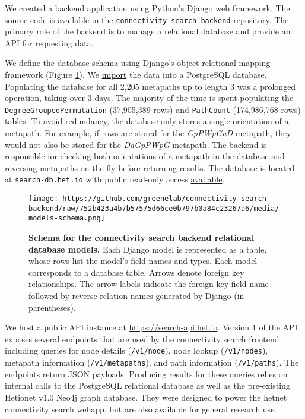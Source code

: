 We created a backend application using Python's Django web framework.
The source code is available in the \href{https://github.com/greenelab/connectivity-search-backend}{\texttt{connectivity-search-backend}} repository.
The primary role of the backend is to manage a relational database and provide an API for requesting data.

We define the database schema \href{https://github.com/greenelab/connectivity-search-backend/blob/af12f8cf2ad47d9a25ce8d1b7889390654eb3bb9/dj_hetmech_app/models.py}{using} Django's object-relational mapping framework (Figure \ref{fig:database}).
We \href{https://github.com/greenelab/connectivity-search-backend/blob/af12f8cf2ad47d9a25ce8d1b7889390654eb3bb9/dj_hetmech_app/management/commands/populate_database.py}{import} the data into a PostgreSQL database.
Populating the database for all 2,205 metapaths up to length 3 was a prolonged operation, \href{https://github.com/greenelab/connectivity-search-backend/pull/41\#issuecomment-488054789}{taking} over 3 days.
The majority of the time is spent populating the \texttt{DegreeGroupedPermutation} (37,905,389 rows) and \texttt{PathCount} (174,986,768 rows) tables.
To avoid redundancy, the database only stores a single orientation of a metapath.
For example, if rows are stored for the \emph{GpPWpGaD} metapath,
they would not also be stored for the \emph{DaGpPWpG} metapath.
The backend is responsible for checking both orientations of a metapath in the database and reversing metapaths on-the-fly before returning results.
The database is located at \texttt{search-db.het.io} with public read-only access \href{https://github.com/greenelab/connectivity-search-backend\#database}{available}.

\begin{figure}
\hypertarget{fig:database}{%
\centering
\texttt{[image: https://github.com/greenelab/connectivity-search-backend/raw/752b423a4b7b57575d66ce0b797b0a84c23267a6/media/models-schema.png]}
\caption{\textbf{Schema for the connectivity search backend relational database models.}
Each Django model is represented as a table,
whose rows list the model's field names and types.
Each model corresponds to a database table.
Arrows denote foreign key relationships.
The arrow labels indicate the foreign key field name followed by reverse relation names generated by Django (in parentheses).}\label{fig:database}
}
\end{figure}

We host a public API instance at \url{https://search-api.het.io}.
Version 1 of the API exposes several endpoints that are used by the connectivity search frontend including queries for
node details (\texttt{/v1/node}),
node lookup (\texttt{/v1/nodes}),
metapath information (\texttt{/v1/metapaths}),
and path information (\texttt{/v1/paths}).
The endpoints return JSON payloads.
Producing results for these queries relies on internal calls to the PostgreSQL relational database as well as the pre-existing Hetionet v1.0 Neo4j graph database.
They were designed to power the hetnet connectivity search webapp,
but are also available for general research use.

